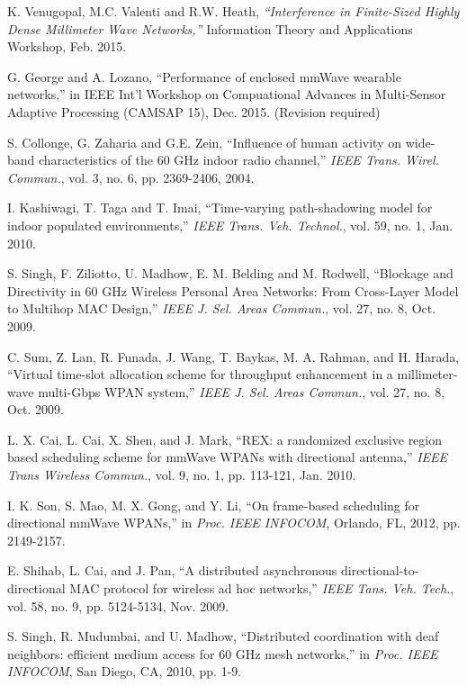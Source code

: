 \documentclass[10pt, conference, letterpaper]{IEEEtran}
\begin{document}
\begin{thebibliography}{50}
K. Venugopal, M.C. Valenti and R.W. Heath, \emph{``Interference in Finite-Sized Highly Dense Millimeter Wave Networks,''} Information Theory and Applications Workshop, Feb. 2015.

G. George and A. Lozano, ``Performance of enclosed mmWave wearable networks,'' in IEEE Int'l Workshop on Compuational Advances in Multi-Sensor Adaptive Processing (CAMSAP 15), Dec. 2015. (Revision required)

S. Collonge, G. Zaharia and G.E. Zein, ``Influence of human activity on wide-band characteristics of the 60 GHz indoor radio channel,'' \emph{IEEE Trans. Wirel. Commun.}, vol. 3,  no. 6, pp. 2369-2406, 2004.

I. Kashiwagi, T. Taga and T. Imai, ``Time-varying path-shadowing model for indoor populated environments,'' \emph{IEEE Trans. Veh. Technol.}, vol. 59, no. 1, Jan. 2010.

S. Singh, F. Ziliotto, U. Madhow, E. M. Belding and M. Rodwell, ``Blockage and Directivity in 60 GHz Wireless Personal Area Networks: From Cross-Layer Model to Multihop MAC Design,'' \emph{IEEE J. Sel. Areas Commun.}, vol. 27, no. 8, Oct. 2009.


C. Sum, Z. Lan, R. Funada, J. Wang, T. Baykas, M. A. Rahman, and H. Harada, ``Virtual time-slot allocation scheme for throughput enhancement in a millimeter-wave multi-Gbps WPAN system,'' \emph{IEEE J. Sel. Areas Commun.}, vol. 27, no. 8, Oct. 2009.

L. X. Cai, L. Cai, X. Shen, and J. Mark, ``REX: a randomized exclusive region based scheduling scheme for mmWave WPANs with directional antenna,'' \emph{IEEE Trans Wireless Commun.}, vol. 9, no. 1, pp. 113-121, Jan. 2010. 

I. K. Son, S. Mao, M. X. Gong, and Y. Li, ``On frame-based scheduling for directional mmWave WPANs,'' in \emph{Proc. IEEE INFOCOM}, Orlando, FL, 2012, pp. 2149-2157.

E. Shihab, L. Cai, and J. Pan, ``A distributed asynchronous directional-to-directional MAC protocol for wireless ad hoc networks,'' \emph{IEEE Tans. Veh. Tech.}, vol. 58, no. 9, pp. 5124-5134, Nov. 2009. 

S. Singh, R. Mudumbai, and U. Madhow, ``Distributed coordination with deaf neighbors: efficient medium access for 60 GHz mesh networks,'' in \emph{Proc. IEEE INFOCOM}, San Diego, CA, 2010, pp. 1-9.


\end{thebibliography}
\end{document}
